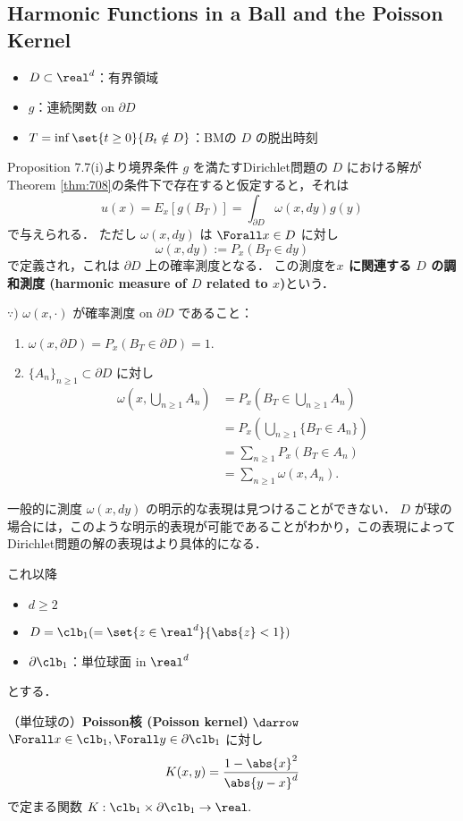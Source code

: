 \documentclass{jsarticle}
\begin{document}
\subsection{Harmonic Functions in a Ball and the Poisson Kernel}

\begin{itemize}
    \item 
    $D\subset \real^d$：有界領域
    \item
    $g$：連続関数 on $\partial D$
    \item
    $T=\inf\set{t\ge0}{B_t\notin D}$：BMの $D$ の脱出時刻
\end{itemize}

Proposition 7.7(i)より境界条件 $g$ を満たすDirichlet問題の $D$ における解がTheorem \ref{thm:708}の条件下で存在すると仮定すると，それは
$$
u(x)
= E_x[g(B_T)]
= \int_{\partial D}\omega(x, dy)g(y)
$$
で与えられる．
ただし $\omega(x, dy)$ は $\Forall x\in D$ に対し 
$$
\omega(x, dy)
:= P_x(B_T\in dy)
$$
で定義され，これは $\partial D$ 上の確率測度となる．
この測度を\textbf{$x$ に関連する $D$ の調和測度 (harmonic measure of $D$ related to $x$)}という．

\begin{screen}
    $\because)$
    $\omega(x, \cdot)$ が確率測度 on $\partial D$ であること：
    \begin{enumerate}[label=(\roman*)]
        \item
        $\omega(x, \partial D)=P_x(B_T\in \partial D)=1.$
        \item
        $\{A_n\}_{n\ge1}\subset \partial D$ に対し
        \begin{align}
            \omega(x, \bigcup_{n\ge1}A_n)
            &= P_x(B_T\in \bigcup_{n\ge1}A_n) \\
            &= P_x(\bigcup_{n\ge1}\{B_T\in A_n\}) \\
            &= \sum_{n\ge1}P_x(B_T\in A_n) \\
            &= \sum_{n\ge1}\omega(x, A_n).
        \end{align}
    \end{enumerate}
\end{screen}

一般的に測度 $\omega(x, dy)$ の明示的な表現は見つけることができない．
$D$ が球の場合には，このような明示的表現が可能であることがわかり，この表現によってDirichlet問題の解の表現はより具体的になる．

これ以降
\begin{itemize}
    \item $d\ge2$
    \item $D=\clb_1(=\set{z\in\real^d}{\abs{z}<1})$
    \item $\partial \clb_1$：単位球面 in $\real^d$
\end{itemize}
とする．

\begin{shadebox}
    \begin{df}
        （単位球の）\textbf{Poisson核 (Poisson kernel)}
        $\darrow$
        $\Forall x\in\clb_1, \Forall y\in\partial\clb_1$ に対し
        $$
        K(x, y)
        = \frac{1-\abs{x}^2}{\abs{y-x}^d}
        $$
        で定まる関数 $K:\clb_1\times\partial\clb_1\to\real.$
    \end{df}
\end{shadebox}
\end{document}

